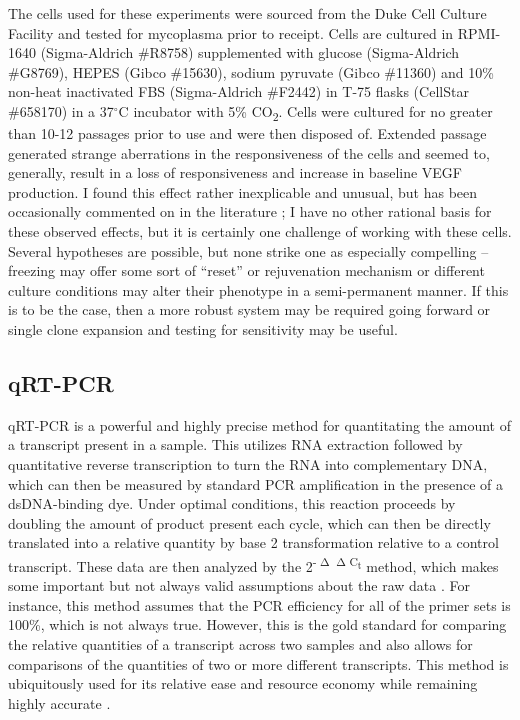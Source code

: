 The cells used for these experiments were sourced from the Duke Cell Culture Facility and tested for mycoplasma prior to receipt. Cells are cultured in RPMI-1640 (Sigma-Aldrich \#R8758) supplemented with glucose (Sigma-Aldrich \#G8769), HEPES (Gibco \#15630), sodium pyruvate (Gibco \#11360) and 10\% non-heat inactivated FBS (Sigma-Aldrich \#F2442) in T-75 flasks (CellStar \#658170) in a 37$^{\circ}$C incubator with 5\% CO\textsubscript{2}. Cells were cultured for no greater than 10-12 passages prior to use and were then disposed of. Extended passage generated strange aberrations in the responsiveness of the cells and seemed to, generally, result in a loss of responsiveness and increase in baseline VEGF production. I found this effect rather inexplicable and unusual, but has been occasionally commented on in the literature \citep{An2009, Chanput2015, Gazova2020, Lund2016, Stokes1999}; I have no other rational basis for these observed effects, but it is certainly one challenge of working with these cells. Several hypotheses are possible, but none strike one as especially compelling -- freezing may offer some sort of ``reset'' or rejuvenation mechanism or different culture conditions may alter their phenotype in a semi-permanent manner. If this is to be the case, then a more robust system may be required going forward or single clone expansion and testing for sensitivity may be useful.

\subsection{qRT-PCR}\label{qrtpcr}

qRT-PCR is a powerful and highly precise method for quantitating the amount of a transcript present in a sample. This utilizes RNA extraction followed by quantitative reverse transcription to turn the RNA into complementary DNA, which can then be measured by standard PCR amplification in the presence of a dsDNA-binding dye. Under optimal conditions, this reaction proceeds by doubling the amount of product present each cycle, which can then be directly translated into a relative quantity by base 2 transformation relative to a control transcript. These data are then analyzed by the 2\textsuperscript{-$\upDelta\upDelta$C\textsubscript{t}} method, which makes some important but not always valid assumptions about the raw data \citep{Livak2001, Cikos2007}. For instance, this method assumes that the PCR efficiency for all of the primer sets is 100\%, which is not always true. However, this is the gold standard for comparing the relative quantities of a transcript across two samples and also allows for comparisons of the quantities of two or more different transcripts. This method is ubiquitously used for its relative ease and resource economy while remaining highly accurate \citep{Dvinge2009, Perkins2012, Pabinger2014}.

